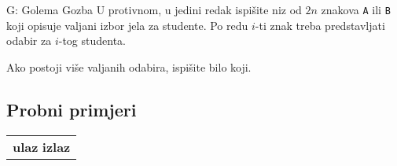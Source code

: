 \begin{statement}[
  timelimit=1 s,
  memorylimit=512 MiB,
]{G: Golema Gozba}
U protivnom, u jedini redak ispišite niz od $2n$ znakova \texttt{A} ili
\texttt{B} koji opisuje valjani izbor jela za studente. Po redu $i$-ti znak
treba predstavljati odabir za $i$-tog studenta.

Ako postoji više valjanih odabira, ispišite bilo koji.

\subsection*{Probni primjeri}
\begin{tabularx}{\textwidth}{X}
  \textbf{ulaz}
  \linespread{1}{}
  \textbf{izlaz}
  \linespread{1}{}
\end{tabularx}

\end{statement}

